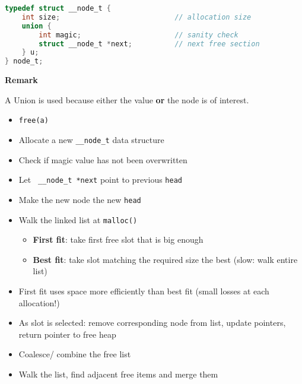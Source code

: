 \begin{lstlisting}[language={C}]
typedef struct __node_t {
    int size;                           // allocation size
    union {
        int magic;                      // sanity check
        struct __node_t *next;          // next free section
    } u;
} node_t;         
\end{lstlisting}
\textbf{Remark}

A Union is used because either the  value \textbf{or} the  node is of interest.


\begin{itemize}
    \item \lstinline{free(a)}%
    \item Allocate a new \lstinline{__node_t} data structure
    \item Check if magic value has not been overwritten
    \item Let \lstinline{ __node_t *next} point to previous \lstinline{head}
    \item Make the new node the new \lstinline{head}
\end{itemize}


\begin{itemize}
    \item Walk the linked list at \lstinline{malloc()} %
          \begin{itemize}
              \item \textbf{First fit}: take first free slot that is big enough
              \item \textbf{Best fit}: take slot matching the required size the best (slow: walk entire list)
          \end{itemize}
    \item First fit uses space more efficiently than best fit (small losses at each allocation!)
    \item As slot is selected: remove corresponding node from list, update pointers, return pointer to free heap
\end{itemize}


\begin{itemize}
    \item Coalesce/ combine the free list
    \item Walk the list, find adjacent free items and merge them
\end{itemize}

